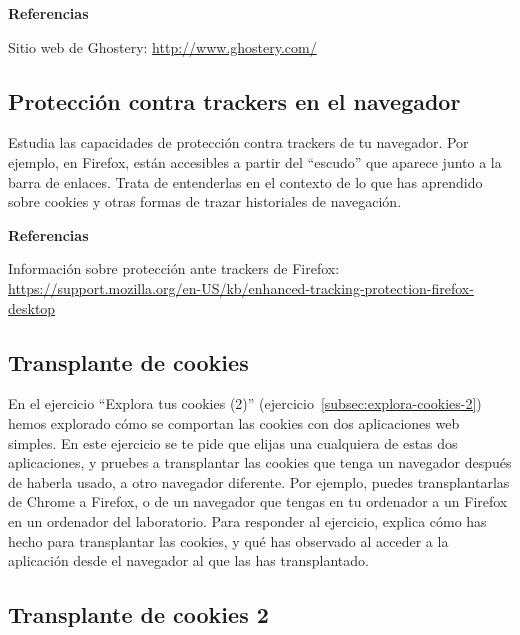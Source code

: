 \textbf{Referencias}

Sitio web de Ghostery: \url{http://www.ghostery.com/}

\subsection{Protección contra trackers en el navegador}
\label{subsec:trackers-navegador}

Estudia las capacidades de protección contra trackers de tu navegador. Por ejemplo, en Firefox, están accesibles a partir del ``escudo'' que aparece junto a la barra de enlaces. Trata de entenderlas en el contexto de lo que has aprendido sobre cookies y otras formas de trazar historiales de navegación.

\textbf{Referencias}

Información sobre protección ante trackers de Firefox: \\
\url{https://support.mozilla.org/en-US/kb/enhanced-tracking-protection-firefox-desktop}

\subsection{Transplante de cookies}
\label{subsec:transplante-cookies}

En el ejercicio ``Explora tus cookies (2)'' (ejercicio~\ref{subsec:explora-cookies-2}) hemos explorado cómo se comportan las cookies con dos aplicaciones web simples. En este ejercicio se te pide que elijas una cualquiera de estas dos aplicaciones, y pruebes a transplantar las cookies que tenga un navegador después de haberla usado, a otro navegador diferente. Por ejemplo, puedes transplantarlas de Chrome a Firefox, o de un navegador que tengas en tu ordenador a un Firefox en un ordenador del laboratorio. Para responder al ejercicio, explica cómo has hecho para transplantar las cookies, y qué has observado al acceder a la aplicación desde el navegador al que las has transplantado.

\subsection{Transplante de cookies 2}
\label{subsec:transplante-cookies2}

